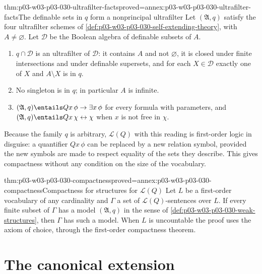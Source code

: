 \begin{hblemma}{thm:p03-w03-p03-030-ultrafilter-facts}{proved=annex:p03-w03-p03-030-ultrafilter-facts}{The definable sets in \(q\) form a nonprincipal ultrafilter}
Let \((\mathfrak A,q)\) satisfy the four ultrafilter schemes of
\cref{def:p03-w03-p03-030-self-extending-theory}, with \(A\ne\varnothing\).
Let \(\mathcal D\) be the Boolean algebra of definable subsets of \(A\).
\begin{enumerate}
\item \(q\cap\mathcal D\) is an ultrafilter of \(\mathcal D\): it contains
  \(A\) and not \(\varnothing\), it is closed under finite intersections and
  under definable supersets, and for each \(X\in\mathcal D\) exactly one of
  \(X\) and \(A\setminus X\) is in \(q\).
\item No singleton is in \(q\); in particular \(A\) is infinite.
\item \((\mathfrak A,q)\entails Qx\,\phi\rightarrow\exists x\,\phi\) for every
  formula with parameters, and \((\mathfrak A,q)\entails
  Qx\,\chi\leftrightarrow\chi\) when \(x\) is not free in \(\chi\).
\end{enumerate}
\end{hblemma}

Because the family \(q\) is arbitrary, \(\mathscr L(Q)\) with this reading
is first-order logic in disguise: a quantifier \(Qx\,\phi\) can be replaced
by a new relation symbol, provided the new symbols are made to respect equality
of the sets they describe.  This gives compactness without any condition on
the size of the vocabulary.

\begin{hblemma}{thm:p03-w03-p03-030-compactness}{proved=annex:p03-w03-p03-030-compactness}{Compactness for structures for \(\mathscr L(Q)\)}
Let \(L\) be a first-order vocabulary of any cardinality and \(\Gamma\) a set
of \(\mathscr L(Q)\)-sentences over \(L\).  If every finite subset of
\(\Gamma\) has a model \((\mathfrak A,q)\) in the sense of
\cref{def:p03-w03-p03-030-weak-structures}, then \(\Gamma\) has such a model.
When \(L\) is uncountable the proof uses the axiom of choice, through the
first-order compactness theorem.
\end{hblemma}

\section{The canonical extension}
\label{sec:p03-w03-p03-030-canonical}

